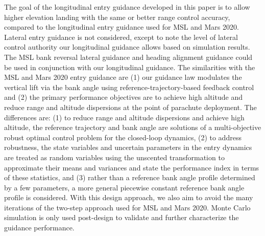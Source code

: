 \documentclass[journal ]{new-aiaa}
\begin{document}

The goal of the longitudinal entry guidance developed in this paper is to allow higher elevation landing with the same or better range control accuracy, compared to the longitudinal entry guidance used for MSL and Mars 2020. Lateral entry guidance is not considered, except to note the level of lateral control authority our longitudinal guidance allows based on simulation results. The MSL bank reversal lateral guidance and heading alignment guidance could be used in conjunction with our longitudinal guidance. The similarities with the MSL and Mars 2020 entry guidance are (1) our guidance law modulates the vertical lift via the bank angle using reference-trajectory-based feedback control and (2) the primary performance objectives are to achieve high altitude and reduce range and altitude dispersions at the point of parachute deployment. The differences are: (1) to reduce range and altitude dispersions and achieve high altitude, the reference trajectory and bank angle are solutions of a multi-objective robust optimal control problem for the closed-loop dynamics, (2) to address robustness, the state variables and uncertain parameters in the entry dynamics are treated as random variables using the unscented transformation to approximate their means and variances and state the performance index in terms of these statistics, and (3) rather than a reference bank angle profile determined by a few parameters, a more general piecewise constant reference bank angle profile is considered. With this design approach, we also aim to avoid the many iterations of the two-step approach used for MSL and Mars 2020. Monte Carlo simulation is only used post-design to validate and further characterize the guidance performance.
\end{document}
